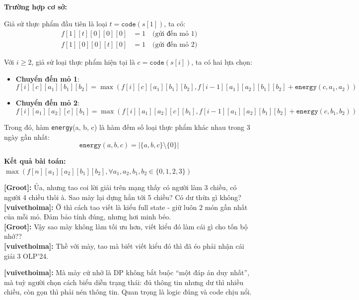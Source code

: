 \textbf{Trường hợp cơ sở:}

Giả sử thực phẩm đầu tiên là loại $t = \texttt{code}(s[1])$, ta có:
\begin{align*}
f[1][t][0][0][0] &= 1 \quad \text{(gửi đến mỏ 1)} \\
f[1][0][0][t][0] &= 1 \quad \text{(gửi đến mỏ 2)}
\end{align*}

Với $i \geq 2$, giả sử loại thực phẩm hiện tại là $c = \texttt{code}(s[i])$, ta có hai lựa chọn:

\begin{itemize}
    \item \textbf{Chuyển đến mỏ 1}:
    \[
    f[i][c][a_1][b_1][b_2] = \max(f[i][c][a_1][b_1][b_2], f[i - 1][a_1][a_2][b_1][b_2] + \texttt{energy}(c, a_1, a_2))
    \]

    \item \textbf{Chuyển đến mỏ 2}:
    \[
    f[i][a_1][a_2][c][b_1] = \max(f[i][a_1][a_2][c][b_1], f[i - 1][a_1][a_2][b_1][b_2] + \texttt{energy}(c, b_1, b_2))
    \]
\end{itemize}

Trong đó, hàm \texttt{energy}(a, b, c) là hàm đếm số loại thực phẩm khác nhau trong 3 ngày gần nhất:
\[
\texttt{energy}(a, b, c) = \left| \{a, b, c\} \setminus \{0\} \right|
\]


\textbf{Kết quả bài toán:} $\max(f[n][a_1][a_2][b_1][b_2], \forall a_1, a_2, b_1, b_2 \in \{0,1,2,3\})$

\textbf{[Groot]:} Ủa, nhưng tao coi lời giải trên mạng thấy có người làm 3 chiều, có người 4 chiều thôi à. Sao mày lại dựng hẳn tới 5 chiều? Có dư thừa gì không?\\

\textbf{[vuivethoima]:} Ờ thì cách tao viết là kiểu full state - giữ luôn 2 món gần nhất của mỗi mỏ. Đảm bảo tính đúng, nhưng hơi minh béo. \\

\textbf{[Groot]:} Vậy sao mày không làm tối ưu hơn, viết kiểu đó làm cái gì cho tốn bộ nhớ??\\

\textbf{[vuivethoima]:} Thề với mày, tao mà biết viết kiểu đó thì đã éo phải nhận cái giải 3 OLP'24.

\textbf{[vuivethoima]:} Mà mày cứ nhớ là DP không bắt buộc ``một đáp án duy nhất'', mà tuỳ người chọn cách biểu diễn trạng thái: đủ thông tin nhưng dư thì nhiều chiều, còn gọn thì phải nén thông tin. Quan trọng là logic đúng và code chịu nổi.

